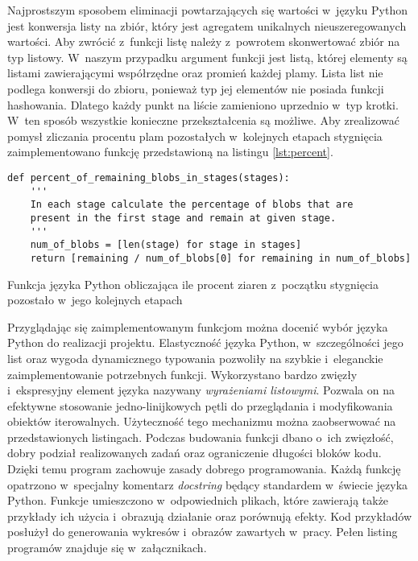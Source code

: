 Najprostszym sposobem eliminacji powtarzających się wartości w~języku Python
jest konwersja listy na zbiór, który jest agregatem unikalnych 
nieuszeregowanych wartości.
Aby zwrócić z~funkcji listę należy z~powrotem skonwertować zbiór na typ
listowy.
W~naszym przypadku argument funkcji jest listą, której elementy są listami
zawierającymi współrzędne oraz promień każdej plamy.
Lista list nie podlega konwersji do zbioru, ponieważ typ jej elementów
nie posiada funkcji hashowania.
Dlatego każdy punkt na liście zamieniono uprzednio w~typ krotki.
W~ten sposób wszystkie konieczne przekształcenia są możliwe.
Aby zrealizować pomysł zliczania procentu plam pozostałych w~kolejnych etapach
stygnięcia zaimplementowano funkcję przedstawioną na listingu
\ref{lst:percent}.
\begin{listing}[htb]
\begin{verbatim}
def percent_of_remaining_blobs_in_stages(stages):
    '''
    In each stage calculate the percentage of blobs that are
    present in the first stage and remain at given stage.
    '''
    num_of_blobs = [len(stage) for stage in stages]
    return [remaining / num_of_blobs[0] for remaining in num_of_blobs]
\end{verbatim}
\caption{Funkcja języka Python obliczająca ile procent ziaren z~początku
         stygnięcia pozostało w~jego kolejnych etapach}
\label{lst:percent}
\end{listing}

Przyglądając się zaimplementowanym funkcjom można docenić wybór języka
Python do realizacji projektu.
Elastyczność języka Python, w~szczególności jego list oraz wygoda
dynamicznego typowania pozwoliły na szybkie i~eleganckie zaimplementowanie
potrzebnych funkcji.
Wykorzystano bardzo zwięzły i~ekspresyjny element języka nazywany
\emph{wyrażeniami listowymi}.
Pozwala on na efektywne stosowanie jedno-linijkowych pętli do przeglądania
i modyfikowania obiektów iterowalnych.
Użyteczność tego mechanizmu można zaobserwować na przedstawionych listingach.
Podczas budowania funkcji dbano o~ich zwięzłość, dobry podział realizowanych
zadań oraz ograniczenie długości bloków kodu.
Dzięki temu program zachowuje zasady dobrego programowania.
Każdą funkcję opatrzono w~specjalny komentarz \emph{docstring} będący
standardem w~świecie języka Python.
Funkcje umieszczono w~odpowiednich plikach, które zawierają także
przykłady ich użycia i~obrazują działanie oraz porównują efekty.
Kod przykładów posłużył do generowania wykresów i~obrazów zawartych
w~pracy.
Pełen listing programów znajduje się w~załącznikach.

